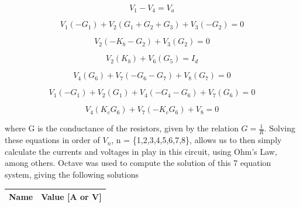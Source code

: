 \begin{center}
    \begin{equation}  
      V_1 - V_4 = V_a
       \end{equation}
\end{center}

\begin{center}
  \begin{equation}
    V_1(-G_1) + V_2(G_1+G_2+G_3) + V_3(-G_2) = 0
  \end{equation}
\end{center}

\begin{center}
  \begin{equation}
    V_2(-K_b-G_2) + V_3(G_2)= 0
  \end{equation}
\end{center}

\begin{center}
  \begin{equation}
    V_2(K_b) + V_6(G_5) = I_d
  \end{equation}
\end{center}

\begin{center}
  \begin{equation}
    V_4(G_6) + V_7(-G_6-G_7) + V_8(G_7) = 0
  \end{equation}
\end{center}

\begin{center}
  \begin{equation}
    V_1(-G_1) + V_2 (G_1) + V_4 (-G_4 - G_6) +  V_7(G_6) = 0
  \end{equation}
\end{center}

\begin{center}
  \begin{equation}
    V_4(K_cG_6)  + V_7 (-K_c G_6) + V_8 = 0
  \end{equation}
\end{center}

where G is the conductance of the resistors, given by the relation $G = \frac{1}{R}$. Solving these equations in order of $V_n$, n = \{1,2,3,4,5,6,7,8\}, allows us to then simply calculate the currents and voltages in play in this circuit, using Ohm's Law, among others. Octave was used to compute the solution of this 7 equation system, giving the following solutions

\begin{table}
  \centering
  \begin{tabular}{|l|r|}
    \hline    
    {\bf Name} & {\bf Value [A or V]} \\ \hline
    
  \end{tabular}
  \label{tab:op}
\end{table}


